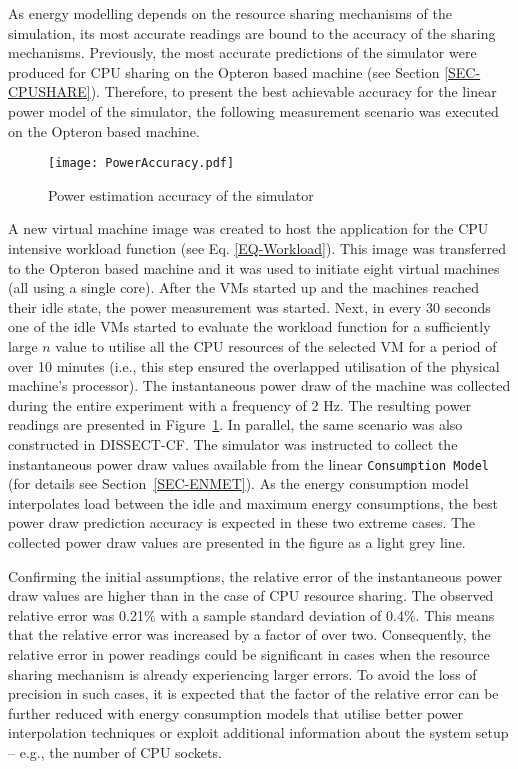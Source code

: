 \documentclass[sort, compress, 5p]{elsarticle}
\begin{document}
As energy modelling depends on the resource sharing mechanisms of the simulation, its most accurate readings are bound to the accuracy of the sharing mechanisms. Previously, the most accurate predictions of the simulator were produced for CPU sharing on the Opteron based machine (see Section \ref{SEC-CPUSHARE}). Therefore, to present the best achievable accuracy for the linear power model of the simulator, the following measurement scenario was executed on the Opteron based machine.

\begin{figure}[tb]
\center
\texttt{[image: PowerAccuracy.pdf]}
\caption{Power estimation accuracy of the simulator\label{FIG-PWTest}}
\end{figure}

A new virtual machine image was created to host the application for the CPU intensive workload function (see Eq. \ref{EQ-Workload}). This image was transferred to the Opteron based machine and it was used to initiate eight virtual machines (all using a single core).  After the VMs started up and the machines reached their idle state, the power measurement was started. Next, in every 30 seconds one of the idle VMs started to evaluate the workload function for a sufficiently large $n$ value to utilise all the CPU resources of the selected VM for a period of over 10 minutes (i.e., this step ensured the overlapped utilisation of the physical machine's processor). The instantaneous power draw of the machine was collected during the entire experiment with a frequency of 2 Hz. The resulting power readings are presented in Figure~\ref{FIG-PWTest}. In parallel, the same scenario was also constructed in DISSECT-CF. The simulator was instructed to collect the instantaneous power draw values available from the linear \verb+Consumption Model+ (for details see Section~\ref{SEC-ENMET}). As the energy consumption model interpolates load between the idle and maximum energy consumptions, the best power draw prediction accuracy is expected in these two extreme cases. The collected power draw values are presented in the figure as a light grey line.

Confirming the initial assumptions, the relative error of the instantaneous power draw values are higher than in the case of CPU resource sharing. The observed relative error was 0.21\% with a sample standard deviation of 0.4\%. This means that the relative error was increased by a factor of over two. Consequently, the relative error in power readings could be significant in cases when the resource sharing mechanism is already experiencing larger errors. To avoid the loss of precision in such cases, it is expected that the factor of the relative error can be further reduced with energy consumption models that utilise better power interpolation techniques or exploit additional information about the system setup -- e.g., the number of CPU sockets.
\end{document}

